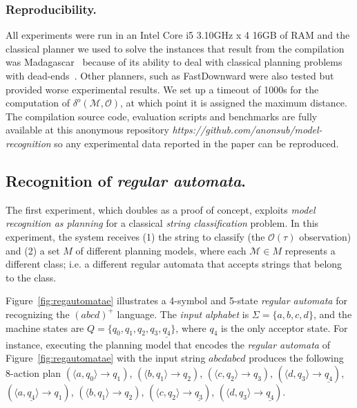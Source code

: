 \documentclass[letterpaper]{article} %
\begin{document}
\subsubsection{Reproducibility.} All experiments were run in an Intel Core i5 3.10GHz x 4 16GB of RAM and the classical planner we used to solve the instances that result from the compilation was {\sc Madagascar}~\cite{rintanen2014madagascar} because of its ability to deal with classical planning problems with dead-ends~\cite{lopez2015deterministic}. Other planners, such as FastDownward were also tested but provided worse experimental results. We set up a timeout of 1000s for the computation of $\delta^o(\mathcal{M},\mathcal{O})$, at which point it is assigned the maximum distance. The compilation source code, evaluation scripts and benchmarks are fully available at this anonymous repository {\em https://github.com/anonsub/model-recognition} so any experimental data reported in the paper can be reproduced.


\subsection{Recognition of {\em regular automata}.} The first experiment, which doubles as a proof of concept, exploits {\em model recognition as planning} for a classical {\em string classification} problem. In this experiment, the system receives (1) the string to classify (the $\mathcal{O}(\tau)$ observation) and (2) a set $M$ of different planning models, where each $\mathcal{M}\in M$ represents a different class; i.e. a different regular automata that accepts strings that belong to the class.

Figure~\ref{fig:regautomatae} illustrates a 4-symbol and 5-state {\em regular automata} for recognizing the $(abcd)^+$ language. The {\em input alphabet} is $\Sigma=\{a,b,c,d\}$, and the machine states are $Q=\{q_0,q_1,q_2,q_3,\underline{q_4}\}$, where \underline{$q_4$} is the only acceptor state. For instance, executing the planning model that encodes the {\em regular automata} of Figure~\ref{fig:regautomatae} with the input string $abcdabcd$ produces the following 8-action plan {\small $(\langle a,q_0\rangle\rightarrow q_1)$, $(\langle b,q_1\rangle\rightarrow q_2)$, $(\langle c,q_2\rangle\rightarrow q_3)$, $(\langle d,q_3\rangle\rightarrow \underline{q_4})$, $(\langle a,\underline{q_4}\rangle\rightarrow q_1)$, $(\langle b,q_1\rangle\rightarrow q_2)$, $(\langle c,q_2\rangle\rightarrow \underline{q_3})$, $(\langle d,q_3\rangle\rightarrow \underline{q_4})$}.
\end{document}
